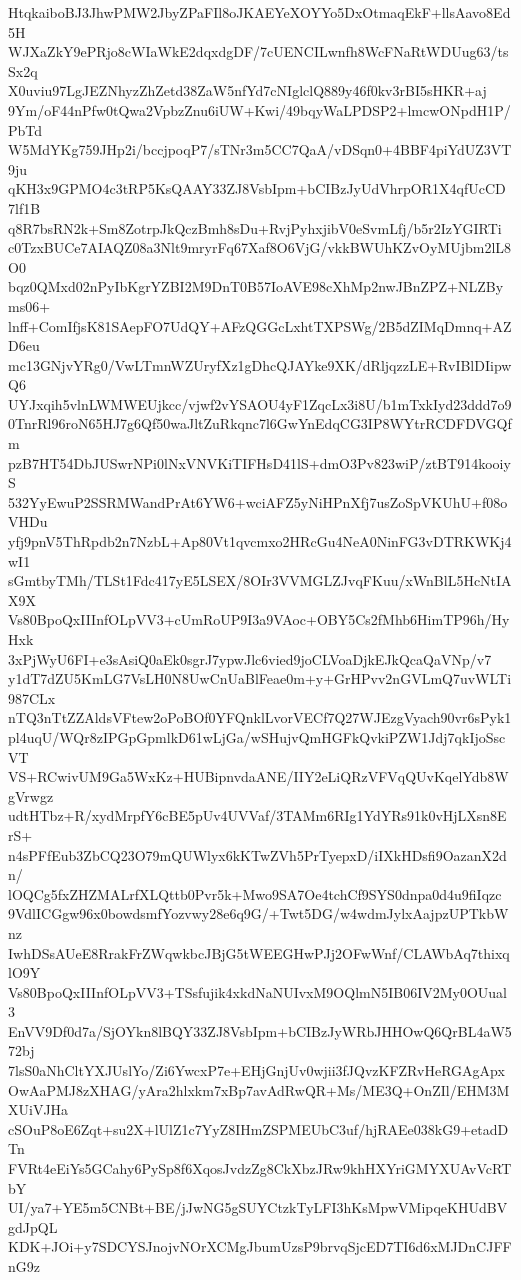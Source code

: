 HtqkaiboBJ3JhwPMW2JbyZPaFIl8oJKAEYeXOYYo5DxOtmaqEkF+llsAavo8Ed5H
WJXaZkY9ePRjo8cWIaWkE2dqxdgDF/7cUENCILwnfh8WcFNaRtWDUug63/tsSx2q
X0uviu97LgJEZNhyzZhZetd38ZaW5nfYd7cNIglclQ889y46f0kv3rBI5sHKR+aj
9Ym/oF44nPfw0tQwa2VpbzZnu6iUW+Kwi/49bqyWaLPDSP2+lmcwONpdH1P/PbTd
W5MdYKg759JHp2i/bccjpoqP7/sTNr3m5CC7QaA/vDSqn0+4BBF4piYdUZ3VT9ju
qKH3x9GPMO4c3tRP5KsQAAY33ZJ8VsbIpm+bCIBzJyUdVhrpOR1X4qfUcCD7lf1B
q8R7bsRN2k+Sm8ZotrpJkQczBmh8sDu+RvjPyhxjibV0eSvmLfj/b5r2IzYGIRTi
c0TzxBUCe7AIAQZ08a3Nlt9mryrFq67Xaf8O6VjG/vkkBWUhKZvOyMUjbm2lL8O0
bqz0QMxd02nPyIbKgrYZBI2M9DnT0B57IoAVE98cXhMp2nwJBnZPZ+NLZByms06+
lnff+ComIfjsK81SAepFO7UdQY+AFzQGGcLxhtTXPSWg/2B5dZIMqDmnq+AZD6eu
mc13GNjvYRg0/VwLTmnWZUryfXz1gDhcQJAYke9XK/dRljqzzLE+RvIBlDIipwQ6
UYJxqih5vlnLWMWEUjkcc/vjwf2vYSAOU4yF1ZqcLx3i8U/b1mTxkIyd23ddd7o9
0TnrRl96roN65HJ7g6Qf50waJltZuRkqnc7l6GwYnEdqCG3IP8WYtrRCDFDVGQfm
pzB7HT54DbJUSwrNPi0lNxVNVKiTIFHsD41lS+dmO3Pv823wiP/ztBT914kooiyS
532YyEwuP2SSRMWandPrAt6YW6+wciAFZ5yNiHPnXfj7usZoSpVKUhU+f08oVHDu
yfj9pnV5ThRpdb2n7NzbL+Ap80Vt1qvcmxo2HRcGu4NeA0NinFG3vDTRKWKj4wI1
sGmtbyTMh/TLSt1Fdc417yE5LSEX/8OIr3VVMGLZJvqFKuu/xWnBlL5HcNtIAX9X
Vs80BpoQxIIInfOLpVV3+cUmRoUP9I3a9VAoc+OBY5Cs2fMhb6HimTP96h/HyHxk
3xPjWyU6FI+e3sAsiQ0aEk0sgrJ7ypwJlc6vied9joCLVoaDjkEJkQcaQaVNp/v7
y1dT7dZU5KmLG7VsLH0N8UwCnUaBlFeae0m+y+GrHPvv2nGVLmQ7uvWLTi987CLx
nTQ3nTtZZAldsVFtew2oPoBOf0YFQnklLvorVECf7Q27WJEzgVyach90vr6sPyk1
pl4uqU/WQr8zIPGpGpmlkD61wLjGa/wSHujvQmHGFkQvkiPZW1Jdj7qkIjoSscVT
VS+RCwivUM9Ga5WxKz+HUBipnvdaANE/IIY2eLiQRzVFVqQUvKqelYdb8WgVrwgz
udtHTbz+R/xydMrpfY6cBE5pUv4UVVaf/3TAMm6RIg1YdYRs91k0vHjLXsn8ErS+
n4sPFfEub3ZbCQ23O79mQUWlyx6kKTwZVh5PrTyepxD/iIXkHDsfi9OazanX2dn/
lOQCg5fxZHZMALrfXLQttb0Pvr5k+Mwo9SA7Oe4tchCf9SYS0dnpa0d4u9fiIqzc
9VdlICGgw96x0bowdsmfYozvwy28e6q9G/+Twt5DG/w4wdmJylxAajpzUPTkbWnz
IwhDSsAUeE8RrakFrZWqwkbcJBjG5tWEEGHwPJj2OFwWnf/CLAWbAq7thixqlO9Y
Vs80BpoQxIIInfOLpVV3+TSsfujik4xkdNaNUIvxM9OQlmN5IB06IV2My0OUual3
EnVV9Df0d7a/SjOYkn8lBQY33ZJ8VsbIpm+bCIBzJyWRbJHHOwQ6QrBL4aW572bj
7lsS0aNhCltYXJUslYo/Zi6YwcxP7e+EHjGnjUv0wjii3fJQvzKFZRvHeRGAgApx
OwAaPMJ8zXHAG/yAra2hlxkm7xBp7avAdRwQR+Ms/ME3Q+OnZIl/EHM3MXUiVJHa
cSOuP8oE6Zqt+su2X+lUlZ1c7YyZ8IHmZSPMEUbC3uf/hjRAEe038kG9+etadDTn
FVRt4eEiYs5GCahy6PySp8f6XqosJvdzZg8CkXbzJRw9khHXYriGMYXUAvVcRTbY
UI/ya7+YE5m5CNBt+BE/jJwNG5gSUYCtzkTyLFI3hKsMpwVMipqeKHUdBVgdJpQL
KDK+JOi+y7SDCYSJnojvNOrXCMgJbumUzsP9brvqSjcED7TI6d6xMJDnCJFFnG9z
